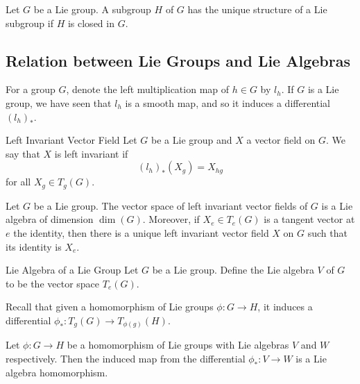 \documentclass[a4paper]{article}
\begin{document}
\begin{prp}{}{} Let $G$ be a Lie group. A subgroup $H$ of $G$ has the unique structure of a Lie subgroup if $H$ is closed in $G$. 
\end{prp}

\subsection{Relation between Lie Groups and Lie Algebras}
For a group $G$, denote the left multiplication map of $h\in G$ by $l_h$. If $G$ is a Lie group, we have seen that $l_h$ is a smooth map, and so it induces a differential $(l_h)_\ast$. 

\begin{defn}{Left Invariant Vector Field}{} Let $G$ be a Lie group and $X$ a vector field on $G$. We say that $X$ is left invariant if $$(l_h)_\ast(X_g)=X_{hg}$$ for all $X_g\in T_g(G)$. 
\end{defn}

\begin{prp}{}{} Let $G$ be a Lie group. The vector space of left invariant vector fields of $G$ is a Lie algebra of dimension $\dim(G)$. Moreover, if $X_e\in T_e(G)$ is a tangent vector at $e$ the identity, then there is a unique left invariant vector field $X$ on $G$ such that its identity is $X_e$. 
\end{prp}

\begin{defn}{Lie Algebra of a Lie Group}{} Let $G$ be a Lie group. Define the Lie algebra $V$ of $G$ to be the vector space $T_e(G)$. 
\end{defn}

Recall that given a homomorphism of Lie groups $\phi:G\to H$, it induces a differential $\phi_\ast:T_g(G)\to T_{\phi(g)}(H)$. 

\begin{prp}{}{} Let $\phi:G\to H$ be a homomorphism of Lie groups with Lie algebras $V$ and $W$ respectively. Then the induced map from the differential $\phi_\ast:V\to W$ is a Lie algebra homomorphism. 
\end{prp}
\end{document}
